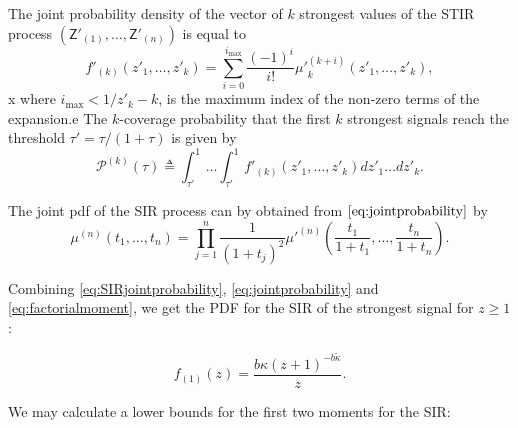\documentclass[conference]{IEEEtran}
\theoremstyle{definition}
\theoremstyle{plain}
\begin{document}
          
          The joint probability density of the vector of $k$ strongest values of the STIR process $(\mathsf{Z}'_{(1)}, \dots, \mathsf{Z}'_{(n)})$ is equal to
          \begin{equation}
            \label{eq:jointprobability}
            f'_{(k)}(z'_1,\dots,z'_k)= \sum^{i_{\text{max}}}_{i=0}\frac{(-1)^i}{i!}{\mu'}_k^{(k+i)}(z'_1,\dots,z'_k),
          \end{equation}x
          where $i_{\text{max}}<1/z'_k-k$, is the maximum index of the non-zero terms of the expansion.e
          The $k$-coverage probability that the first $k$ strongest signals reach the threshold $\tau' =\tau/(1+\tau)$ is given by
          \begin{equation}
      \mathcal{P}^{(k)}(\tau) \triangleq  \int_{\tau'}^1\dots \int_{\tau'}^1 f'_{(k)}({z'_1},\dots,{z'_k})dz'_1 \dots d{z'_k}.
          \end{equation}

          
          The joint pdf of the SIR process can by obtained from $\eqref{eq:jointprobability}$ by
          \begin{equation}
            \label{eq:SIRjointprobability}
            \mu^{(n)}(t_1,\dots,t_n) = \prod_{j=1}^n\frac{1}{(1+t_j)^2}\mu'^{(n)}\left(\frac{t_1}{1+t_1},\dots,\frac{t_n}{1+t_n}\right).
          \end{equation}

          Combining \eqref{eq:SIRjointprobability}, \eqref{eq:jointprobability} and \eqref{eq:factorialmoment}, we get the PDF for the SIR of the strongest signal for $z\geq 1$:
          
          \begin{equation}
            f_{(1)}(z) = \frac {b\kappa\left({z + 1} \right)^{-b\tilde{\kappa}}} {z}.
          \end{equation}


          We may calculate a lower bounds for the first two moments for the SIR:
\end{document}
